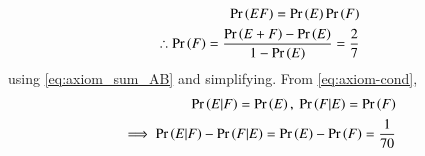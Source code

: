 \begin{align}
    \Pr\left(EF\right) = \Pr\left(E\right)\Pr\left(F\right)\\
	\therefore \Pr\left(F\right) = \frac{\Pr\left(E+F\right)-\Pr\left(E\right)}{{1 - \Pr\left(E\right)}} 
 = \frac{2}{7}
\end{align}
using 
\eqref{eq:axiom_sum_AB}
and simplifying.
From 
\eqref{eq:axiom-cond},
\begin{align}
    \Pr\left(E|F\right) = \Pr\left(E\right),\
    \Pr\left(F|E\right) = \Pr\left(F\right)\\
\implies \Pr\left(E|F\right) - \Pr\left(F|E\right) = \Pr\left(E\right) - \Pr\left(F\right)
    = \frac{1}{70}
\end{align}
